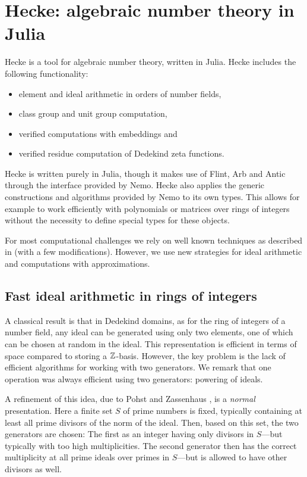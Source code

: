 \documentclass{sig-alternate-05-2015}
\begin{document}
\section{Hecke: algebraic number theory in Julia}
\label{sect:hecke}

Hecke is a tool for algebraic number theory, written in Julia.
Hecke includes the following functionality:
\begin{itemize}
\setlength{\itemsep}{1pt}
\setlength{\parskip}{0pt}
\setlength{\parsep}{0pt}
\item
  element and ideal arithmetic in orders of number fields,
\item
  class group and unit group computation,
\item
  verified computations with embeddings and
\item
  verified residue computation of Dedekind zeta functions.
\end{itemize}

Hecke is written purely in Julia, though it makes use of Flint, Arb and Antic through the interface provided by Nemo.
Hecke also applies the generic constructions and algorithms provided by Nemo to its own types. This allows for example to
work efficiently with polynomials or matrices over rings of integers without the necessity to define special types for these objects.

For most computational challenges we rely on well known techniques as described in \cite{Cohen1993, Pohst1997, Belabas2004}
(with a few modifications). However, we use new strategies for ideal arithmetic and computations with approximations.

\subsection{Fast ideal arithmetic in rings of integers}

A classical result is that in Dedekind domains, as for the ring of integers of a number field, any
ideal can be generated using only two elements, one of which can be chosen
at random in the ideal. This representation is efficient in terms of space compared to storing a
$\mathbb{Z}$-basis. However, the key problem is the lack of
efficient algorithms for working with two generators. We remark that one
operation was always efficient using two generators: powering of ideals.

A refinement of this idea, due to Pohst and Zassenhaus \cite[p. 400]{Pohst1997}, is a 
\textit{normal} presentation. Here a finite set $S$ of prime numbers
is fixed, typically containing at least all prime divisors of the norm of the ideal. Then,
based on this set, the two generators are chosen: The first as an integer
having only divisors in $S$---but typically with too high multiplicities.
The second generator then has the correct multiplicity at all prime ideals
over primes in $S$---but is allowed to have other divisors as well.
\end{document}
